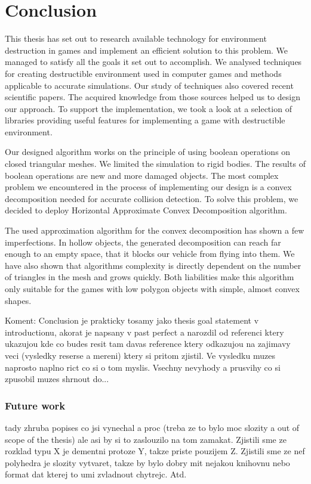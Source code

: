 \chapter*{Conclusion}

This thesis has set out to research available technology for environment destruction in games and implement an efficient solution to this problem. We managed to satisfy all the goals it set out to accomplish. We analysed techniques for creating destructible environment used in computer games and methods applicable to accurate simulations. Our study of techniques also covered recent scientific papers. The acquired knowledge from those sources helped us to design our approach. To support the implementation, we took a look at a selection of libraries providing useful features for implementing a game with destructible environment.

Our designed algorithm works on the principle of using boolean operations on closed triangular meshes. We limited the simulation to rigid bodies. The results of boolean operations are new and more damaged objects. The most complex problem we encountered in the process of implementing our design is a convex decomposition needed for accurate collision detection. To solve this problem, we decided to deploy Horizontal Approximate Convex Decomposition algorithm.

The used approximation algorithm for the convex decomposition has shown a few imperfections. In hollow objects, the generated decomposition can reach far enough to an empty space, that it blocks our vehicle from flying into them. We have also shown that algorithms complexity is directly dependent on the number of triangles in the mesh and grows quickly. Both liabilities make this algorithm only suitable for the games with low polygon objects with simple, almost convex shapes.



Koment: Conclusion je prakticky tosamy jako thesis goal statement v introductionu, akorat je napsany v past perfect a narozdil od referenci ktery ukazujou kde co budes resit tam davas reference ktery odkazujou na zajimavy veci (vysledky reserse a mereni) ktery si pritom zjistil. Ve vysledku muzes naprosto naplno rict co si o tom myslis. Vsechny nevyhody a prusvihy co si zpusobil muzes shrnout do...

\subsection*{Future work}

tady zhruba popises co jsi vynechal a proc (treba ze to bylo moc slozity a out of scope of the thesis) ale asi by si to zaslouzilo na tom zamakat. Zjistili sme ze rozklad typu X je dementni protoze Y, takze priste pouzijem Z. Zjistili sme ze nef polyhedra je slozity vytvaret, takze by bylo dobry mit nejakou knihovnu nebo format dat kterej to umi zvladnout chytrejc. Atd.
